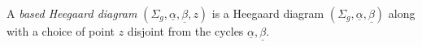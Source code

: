 

    A \emph{based Heegaard diagram}  $(\Sigma_g, \underline \alpha, \underline \beta, z)$ is a Heegaard diagram $(\Sigma_g, \underline \alpha, \underline \beta)$ along with a choice of point $z$ disjoint from the cycles $\underline \alpha, \underline \beta$.
    \label{def:basedHeegaardDiagram}
